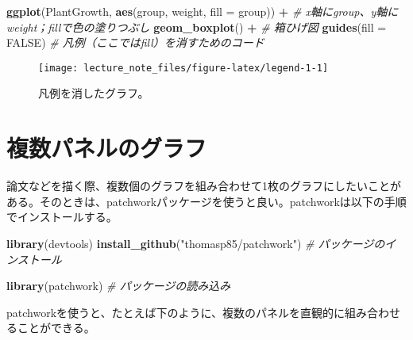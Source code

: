 \documentclass[]{book}
\newenvironment{Shaded}{\begin{snugshade}}{\end{snugshade}}
\newcommand{\KeywordTok}[1]{\textcolor[rgb]{0.13,0.29,0.53}{\textbf{#1}}}
\newcommand{\DataTypeTok}[1]{\textcolor[rgb]{0.13,0.29,0.53}{#1}}
\newcommand{\StringTok}[1]{\textcolor[rgb]{0.31,0.60,0.02}{#1}}
\newcommand{\CommentTok}[1]{\textcolor[rgb]{0.56,0.35,0.01}{\textit{#1}}}
\newcommand{\OtherTok}[1]{\textcolor[rgb]{0.56,0.35,0.01}{#1}}
\newcommand{\OperatorTok}[1]{\textcolor[rgb]{0.81,0.36,0.00}{\textbf{#1}}}
\newcommand{\NormalTok}[1]{#1}
\begin{document}
\begin{Shaded}
\begin{Highlighting}[]
\KeywordTok{ggplot}\NormalTok{(PlantGrowth, }\KeywordTok{aes}\NormalTok{(group, weight, }\DataTypeTok{fill =}\NormalTok{ group)) }\OperatorTok{+}\StringTok{ }\CommentTok{# x軸にgroup、y軸にweight；fillで色の塗りつぶし}
\StringTok{  }\KeywordTok{geom_boxplot}\NormalTok{() }\OperatorTok{+}\StringTok{ }\CommentTok{# 箱ひげ図}
\StringTok{  }\KeywordTok{guides}\NormalTok{(}\DataTypeTok{fill =} \OtherTok{FALSE}\NormalTok{) }\CommentTok{# 凡例（ここではfill）を消すためのコード}
\end{Highlighting}
\end{Shaded}

\begin{figure}

{\centering \texttt{[image: lecture\_note\_files/figure-latex/legend-1-1]} 

}

\caption{凡例を消したグラフ。}\label{fig:legend-1}
\end{figure}

\section{複数パネルのグラフ}

論文などを描く際、複数個のグラフを組み合わせて1枚のグラフにしたいことがある。そのときは、patchworkパッケージを使うと良い。patchworkは以下の手順でインストールする。

\begin{Shaded}
\begin{Highlighting}[]
\KeywordTok{library}\NormalTok{(devtools)}
\KeywordTok{install_github}\NormalTok{(}\StringTok{"thomasp85/patchwork"}\NormalTok{) }\CommentTok{# パッケージのインストール}
\end{Highlighting}
\end{Shaded}

\begin{Shaded}
\begin{Highlighting}[]
\KeywordTok{library}\NormalTok{(patchwork) }\CommentTok{# パッケージの読み込み}
\end{Highlighting}
\end{Shaded}

patchworkを使うと、たとえば下のように、複数のパネルを直観的に組み合わせることができる。
\end{document}
